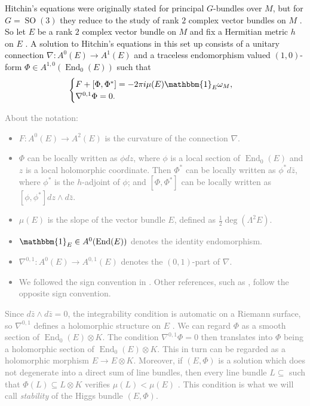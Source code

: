 \documentclass[A4paper, 12pt, british, reqno]{amsart}
\DeclareMathOperator{\End}{End}
\DeclareMathOperator{\SO}{SO}
\newcommand{\ot}{\otimes}
\newcommand{\1}{\mathbbm{1}}
\begin{document}
Hitchin's equations \cite[(1.3)]{hit87a} were originally stated for principal $G$-bundles over $M$, but for $G=\SO(3)$ they reduce to the study of rank $2$ complex vector bundles on $M$ \cite[Beginning of \S 2]{hit87a}.
So let $E$ be a rank $2$ complex vector bundle on $M$ and fix a Hermitian metric $h$ on $E$ \cite[Proposition 4.1.4]{huy05}.
A solution to Hitchin's equations in this set up consists of a unitary connection $\nabla \colon A^{0}(E)\to A^{1}(E)$ and a traceless endomorphism valued $(1,0)$-form $\Phi\in A^{1,0}(\End_{0}(E))$ such that
\begin{equation}\label{eqn:hitchin}
    \begin{cases}
	F+[\Phi,\Phi^{*}]=-2\pi i \mu(E)\1_{E}\w_{M}, \\
	\nabla^{0,1}\Phi=0.
    \end{cases}
\end{equation}
\textcolor{gray}{%
About the notation:
\begin{itemize}
    \item $F\colon A^{0}(E)\to A^{2}(E)$ is the curvature of the connection $\nabla$.
    \item $\Phi$ can be locally written as $\phi dz$, where $\phi$ is a local section of $\End_{0}(E)$ and $z$ is a local holomorphic coordinate.
	Then $\Phi^{*}$ can be locally written as $\phi^{*} d\bar{z}$, where $\phi^{*}$ is the $h$-adjoint of $\phi$; and $[\Phi,\Phi^{*}]$ can be locally written as $[\phi,\phi^{*}]dz\wedge d\bar{z}$.
    \item $\mu(E)$ is the slope of the vector bundle $E$, defined as $\frac{1}{2}\deg(\Lambda^{2}E)$.
    \item $\1_{E}\in A^{0}(\End(E))$ denotes the identity endomorphism.
    \item $\nabla^{0,1}\colon A^{0}(E)\to A^{0,1}(E)$ denotes the $(0,1)$-part of $\nabla$.
    \item We followed the sign convention in \cite[(4.17)]{wen16}.
	Other references, such as \cite[p.~38]{tho05}, follow the opposite sign convention.
\end{itemize}
}

\textcolor{gray}{%
Since $d\bar{z}\wedge d\bar{z}=0$, the integrability condition is automatic on a Riemann surface, so $\nabla^{0,1}$ defines a holomorphic structure on $E$ \cite[Theorem 2.6.26]{huy05}.
We can regard $\Phi$ as a smooth section of $\End_{0}(E)\ot K$.
The condition $\nabla^{0,1}\Phi=0$ then translates into $\Phi$ being a holomorphic section of $\End_{0}(E)\ot K$.
This in turn can be regarded as a holomorphic morphism $E\to E\ot K$.
Moreover, if $(E,\Phi)$ is a solution which does not degenerate into a direct sum of line bundles, then every line bundle $L\subseteq $ such that $\Phi(L)\subseteq L\ot K$ verifies $\mu(L)<\mu(E)$ \cite[Proposition 4.2.16]{wen16}.
This condition is what we will call \textit{stability} of the Higgs bundle $(E,\Phi)$.
}
\end{document}
